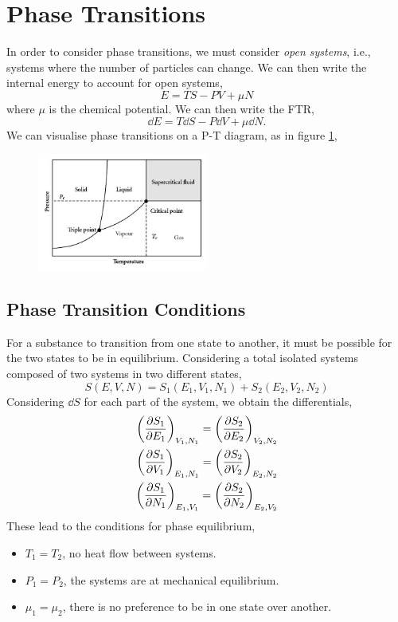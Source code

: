 \documentclass{book}
\begin{document}
\section{Phase Transitions}
In order to consider phase transitions, we must consider \textit{open systems}, i.e., systems where the number of particles can change. We can then write the internal energy to account for open systems,
\begin{equation}
	E = TS - PV + \mu N
\end{equation}
where $\mu$ is the chemical potential. We can then write the FTR,
\begin{equation}
	\dd{E} = T\dd{S} - P\dd{V} + \mu \dd{N}.
\end{equation}
We can visualise phase transitions on a P-T diagram, as in figure \ref{fig:pt},
\begin{figure}
	\centering
	\includegraphics[width=0.5\textwidth]{P-T-diagram.png}
	\caption{}
	\label{fig:pt}
\end{figure}
\subsection{Phase Transition Conditions}
For a substance to transition from one state to another, it must be possible for the two states to be in equilibrium. Considering a total isolated systems composed of two systems in two different states,
\begin{equation}
	S(E,V,N) = S_1(E_1, V_1, N_1) + S_2(E_2,V_2,N_2)
\end{equation}
Considering $\dd{S}$ for each part of the system, we obtain the differentials,
\begin{align}
	\left(\pdv{S_1}{E_1}\right)_{V_1,N_1} = \left(\pdv{S_2}{E_2}\right)_{V_2,N_2} \\
	\left(\pdv{S_1}{V_1}\right)_{E_1,N_1} = \left(\pdv{S_2}{V_2}\right)_{E_2,N_2}\\
	\left(\pdv{S_1}{N_1}\right)_{E_1,V_1} = \left(\pdv{S_2}{N_2}\right)_{E_2,V_2}
\end{align}
These lead to the conditions for phase equilibrium,
\begin{tcolorbox}
	\begin{itemize}
		\item $T_1 = T_2$, no heat flow between systems.
		\item $P_1 = P_2$, the systems are at mechanical equilibrium.
		\item $\mu_1 = \mu_2$, there is no preference to be in one state over another.
	\end{itemize}
\end{tcolorbox}
\end{document}
